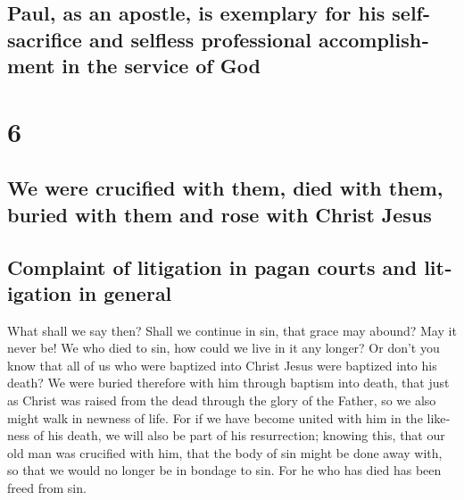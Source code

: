 \begin{paracol}{2}
\switchcolumn
\begin{otherlanguage}{english}

\hypertarget{paul-as-an-apostle-is-exemplary-for-his-self-sacrifice-and-selfless-professional-accomplishment-in-the-service-of-god}{%
\subsection{Paul, as an apostle, is exemplary for his self-sacrifice and
selfless professional accomplishment in the service of
God}\label{paul-as-an-apostle-is-exemplary-for-his-self-sacrifice-and-selfless-professional-accomplishment-in-the-service-of-god}}

\hypertarget{section-11}{%
\section{6}\label{section-11}}

\hypertarget{we-were-crucified-with-them-died-with-them-buried-with-them-and-rose-with-christ-jesus}{%
\subsection{We were crucified with them, died with them, buried with
them and rose with Christ
Jesus}\label{we-were-crucified-with-them-died-with-them-buried-with-them-and-rose-with-christ-jesus}}

\hypertarget{complaint-of-litigation-in-pagan-courts-and-litigation-in-general}{%
\subsection{Complaint of litigation in pagan courts and litigation in
general}\label{complaint-of-litigation-in-pagan-courts-and-litigation-in-general}}

 What shall we say then? Shall we continue in sin, that
grace may abound?  May it never be! We who died to sin,
how could we live in it any longer?  Or don't you know
that all of us who were baptized into Christ Jesus were baptized into
his death?  We were buried therefore with him through
baptism into death, that just as Christ was raised from the dead through
the glory of the Father, so we also might walk in newness of life.
 For if we have become united with him in the likeness of
his death, we will also be part of his resurrection; 
knowing this, that our old man was crucified with him, that the body of
sin might be done away with, so that we would no longer be in bondage to
sin.  For he who has died has been freed from sin.


\end{otherlanguage}
\end{paracol}
